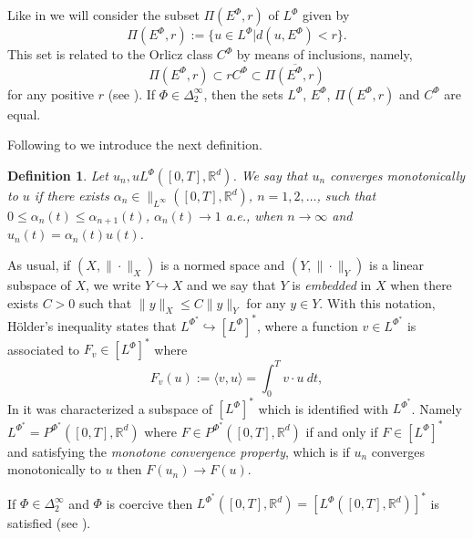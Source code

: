 \documentclass[twoside]{article}
\newtheorem{defi}[thm]{Definition}
\theoremstyle{remark}
\newcommand{\linf}{\|_{L^{\infty}}}
\newcommand{\lphi}{L^{\Phi}}
\newcommand{\lpsi}{L^{\Phi^*}}
\newcommand{\ephi}{E^{\Phi}}
\newcommand{\claseor}{C^{\Phi}}
\newcommand{\rr}{\mathbb{R}}
\renewcommand{\leq}{\leqslant}
\newcommand{\Phie}{\Phi^{*}}
\begin{document}
Like in \cite{KR} we will consider the subset $\Pi(\ephi,r)$ of $\lphi$ given by
\[\Pi(\ephi,r):=\{u\in\lphi| d(u,\ephi)<r\}.\]
This set is related to the Orlicz class $\claseor$ by means of inclusions, namely,
\begin{equation}\label{inclusiones}\Pi(\ephi, r )\subset r \claseor\subset\overline{\Pi(\ephi,r)}
\end{equation}
for any positive $r$ (see \cite[Th. 5.6]{Orliczvectorial2005}).
If $\Phi \in \Delta_2^{\infty}$,  then the sets $\lphi$, $\ephi$, $\Pi(\ephi,r)$ and $\claseor$ are equal.

Following to \cite{Desch2001} we introduce the next definition.

\begin{defi} Let $u_n,u\lphi([0,T],\rr^d)$. We say that $u_n$ converges monotonically to $u$ if there exists $\alpha_n\in\linf([0,T],\rr^d)$, $n=1,2,\ldots$, such that $0\leq \alpha_n(t)\leq \alpha_{n+1}(t)$, $\alpha_n(t)\to 1$ a.e., when $n\to\infty$ and $u_n(t)=\alpha_n(t)u(t)$.

\end{defi}

 
As usual, if $(X,\|\cdot\|_X)$ is a normed space and $(Y,\|\cdot \|_Y)$ is a linear subspace of $X$,  we write $Y\hookrightarrow X$ and we say that $Y$ is \emph{embedded} in $X$  when there exists $C>0$ such that
$\|y\|_X\leq C\|y\|_Y$ for any $y\in Y$.  With this notation, H\"older's inequality states that  $\lpsi\hookrightarrow  \left[\lphi\right]^*$, where a function $v\in\lpsi$ is associated  to $F_v\in \left[\lphi\right]^*$ where
\begin{equation}\label{pairing}
  F_v(u):=\langle v,u\rangle=\int_0^Tv\cdot u\ dt,
\end{equation}
 In  \cite[Theorem 2.9]{Desch2001}  it was characterized a subspace of   $\left[\lphi\right]^*$ which is identified with $\lpsi$. Namely $\lpsi=P^{\Phie}([0,T],\rr^d)$ where $F\in P^{\Phie}([0,T],\rr^d)$ if and only if $F\in\left[\lphi\right]^*$ and satisfying the \emph{monotone convergence property}, which is if $u_n$ converges monotonically to $u$ then $F(u_n)\to F(u)$.

 If $\Phi \in \Delta_2^{\infty}$ and $\Phi$ is coercive then $\lpsi([0,T],\rr^d)= \left[\lphi([0,T],\rr^d)\right]^*$ is satisfied (see \cite[Th. 2.9 , 2.10]{Desch2001}).

\end{document}

